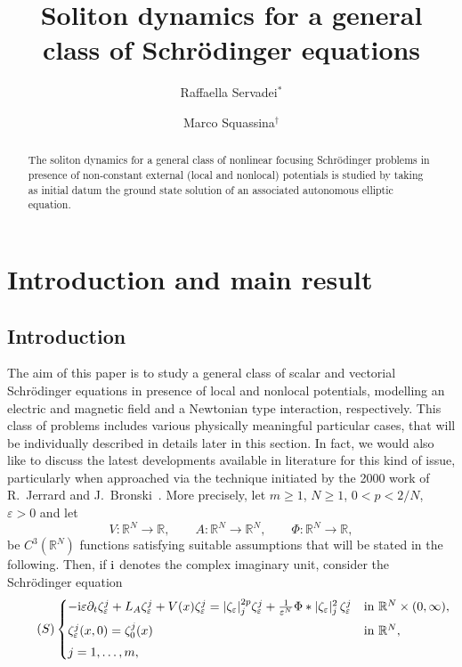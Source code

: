 \documentclass[11pt]{amsart}
\title[Point particle dynamics for general NLS problems]{Soliton dynamics
for a general \\ class of Schr\"odinger equations}
\author[R.\ Servadei]{Raffaella Servadei$^*$}
\author[M.\ Squassina]{Marco Squassina$^\dagger$ }
\numberwithin{equation}{section}
\theoremstyle{definition}
\begin{document}
\begin{abstract}
The soliton dynamics  for
a general class of nonlinear focusing Schr\"odinger problems in presence of non-constant
external (local and nonlocal) potentials is studied by taking as initial datum the ground state
solution of an associated autonomous elliptic equation.
\end{abstract}
\maketitle

\section{Introduction and main result}\label{sec:intro}

\subsection{Introduction}
The aim of this paper is to study a general class of scalar and vectorial Schr\"odinger equations
in presence of local and nonlocal potentials, modelling an electric and magnetic field
and a Newtonian type interaction, respectively. This class of problems includes various
physically meaningful particular cases, that will be individually described in details later in this section.
In fact, we would also like to discuss the latest developments available in literature for this kind of issue, particularly when
approached via the technique initiated by the 2000 work of R.~Jerrard and J.~Bronski~\cite{bronski}.
More precisely, let $m\geq 1$, $N\geq 1$, $0<p<2/N$, ${\varepsilon}>0$ and let
\begin{equation}\label{firo}
V:{{\mathbb R}}^N\to{{\mathbb R}},
\qquad
A:{{\mathbb R}}^N\to{{\mathbb R}}^N,
\qquad
\Phi:{{\mathbb R}}^N\to{{\mathbb R}},
\end{equation}
be $C^3({{\mathbb R}}^N)$ functions satisfying suitable assumptions that will be
stated in the following. Then, if ${{\rm i}}$ denotes the complex imaginary unit,
consider the Schr\"odinger equation
\begin{equation}
    \label{problematilde}
    \tag{$S$}
    \begin{cases}
        -{{\rm i}} {\varepsilon} \partial_t\zeta_{\varepsilon}^j+ L_A\zeta_{\varepsilon}^j+V(x)\zeta_{\varepsilon}^j=|\zeta_{\varepsilon}|^{2p}_j \zeta_{\varepsilon}^j
        +\frac{1}{{\varepsilon}^N}\Phi*|\zeta_{\varepsilon}|^2_j\,\zeta_{\varepsilon}^j & \text{in ${{\mathbb R}}^N\times (0,\infty)$}, \\
        \noalign{\vskip5pt}
        \zeta_{\varepsilon}^j(x,0)=\zeta_0^j(x) & \text{in ${{\mathbb R}}^N$}, \\
        \noalign{\vskip3pt}
        j=1,\dots,m,
    \end{cases}
\end{equation}
\end{document}
